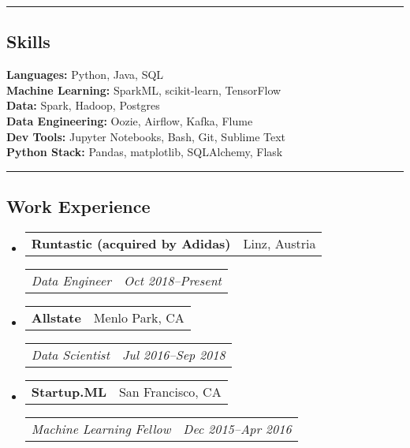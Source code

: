 \documentclass[10pt,letterpaper]{article}
\makeatletter
\newenvironment{indentsection}[1]%
{\begin{list}{}%
	{\setlength{\leftmargin}{#1}}%
	\item[]%
}
{\end{list}}
\newcommand{\headerrow}[2]
{\begin{tabular*}{\linewidth}{l@{\extracolsep{\fill}}r}
	#1 &
	#2 \\
\end{tabular*}}
\newcommand{\jobitem}[4]{\item \headerrow{\textbf{#1}}{#2}
\headerrow{\emph{#3}}{\emph{#4}}}
\makeatother
\begin{document}
\hrule
\subsection*{Skills}
	\begin{indentsection}{\parindent}
		\textbf{Languages:} Python, Java, SQL \\
		\textbf{Machine Learning:} SparkML, scikit-learn, TensorFlow \\	
		\textbf{Data:} Spark, Hadoop, Postgres \\
		\textbf{Data Engineering:} Oozie, Airflow, Kafka, Flume  \\  
		\textbf{Dev Tools:} Jupyter Notebooks, Bash, Git,  Sublime Text \\  
		\textbf{Python Stack:} Pandas, matplotlib, SQLAlchemy, Flask
	\end{indentsection}

\hrule
\subsection*{Work Experience}
\begin{itemize}
	\jobitem{Runtastic (acquired by Adidas)}			{Linz, Austria}
		    {Data Engineer}	{Oct 2018--Present}
\end{itemize}


\begin{itemize}
	\jobitem{Allstate}			{Menlo Park, CA}
		    {Data Scientist}	{Jul 2016--Sep 2018}
\end{itemize}

\begin{itemize}
	\jobitem{Startup.ML}				{San Francisco, CA}
		    {Machine Learning Fellow}	{Dec 2015--Apr 2016}
\end{itemize}
\end{document}
